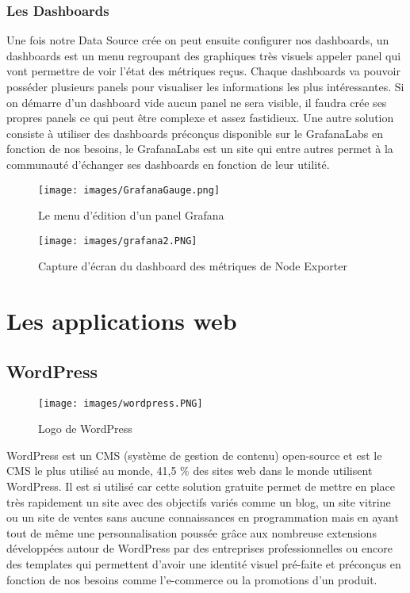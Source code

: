 \documentclass[oneside,12pt]{report}
\begin{document}
\subsection{Les Dashboards}

Une fois notre Data Source crée on peut ensuite configurer nos dashboards, un dashboards est un menu regroupant des graphiques très visuels appeler panel qui vont permettre de voir l'état des métriques reçus. Chaque dashboards va pouvoir posséder plusieurs panels pour visualiser les informations les plus intéressantes. Si on démarre d'un dashboard vide aucun panel ne sera visible, il faudra crée ses propres panels ce qui peut être complexe et assez fastidieux. Une autre solution consiste à utiliser des dashboards préconçus disponible sur le GrafanaLabs en fonction de nos besoins, le GrafanaLabs est un site qui entre autres permet à la communauté d'échanger ses dashboards en fonction de leur utilité.    \newline

\begin{figure}[!ht]
    \centering
    \texttt{[image: images/GrafanaGauge.png]}
    \caption{Le menu d'édition d'un panel Grafana}
    \label{fig:mesh1}
\end{figure}

\begin{figure}[!ht]
    \centering
    \texttt{[image: images/grafana2.PNG]}
    \caption{Capture d'écran du dashboard des métriques de Node Exporter}
    \label{fig:mesh1}
\end{figure}

\chapter{Les applications web}


\section{WordPress}

\begin{figure}[!ht]
    \centering
    \texttt{[image: images/wordpress.PNG]}
    \caption{Logo de WordPress}
    \label{fig:mesh1}
\end{figure}

WordPress est un CMS (système de gestion de contenu) open-source et est le CMS le plus utilisé au monde, 41,5 \% des sites web dans le monde utilisent WordPress. Il est si utilisé car cette solution gratuite permet de mettre en place très rapidement un site avec des objectifs variés comme un blog, un site vitrine ou un site de ventes sans aucune connaissances en programmation mais en ayant tout de même une personnalisation poussée grâce aux nombreuse extensions développées autour de WordPress par des entreprises professionnelles ou encore des templates qui permettent d'avoir une identité visuel pré-faite et préconçus en fonction de nos besoins comme l'e-commerce ou la promotions d'un produit.  \newline
\end{document}
